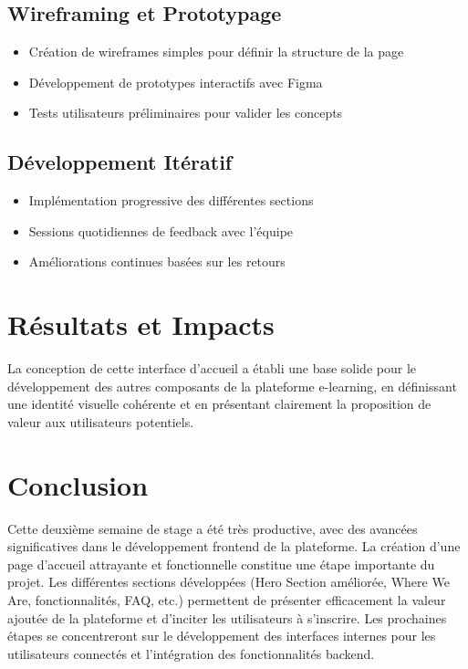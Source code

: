 \subsection{Wireframing et Prototypage}
\begin{itemize}
  \item Création de wireframes simples pour définir la structure de la page
  \item Développement de prototypes interactifs avec Figma
  \item Tests utilisateurs préliminaires pour valider les concepts
\end{itemize}

\subsection{Développement Itératif}
\begin{itemize}
  \item Implémentation progressive des différentes sections
  \item Sessions quotidiennes de feedback avec l'équipe
  \item Améliorations continues basées sur les retours
\end{itemize}

\section{Résultats et Impacts}

La conception de cette interface d'accueil a établi une base solide pour le développement des autres composants de la plateforme e-learning, en définissant une identité visuelle cohérente et en présentant clairement la proposition de valeur aux utilisateurs potentiels. 

\section{Conclusion}

Cette deuxième semaine de stage a été très productive, avec des avancées significatives dans le développement frontend de la plateforme. La création d'une page d'accueil attrayante et fonctionnelle constitue une étape importante du projet. Les différentes sections développées (Hero Section améliorée, Where We Are, fonctionnalités, FAQ, etc.) permettent de présenter efficacement la valeur ajoutée de la plateforme et d'inciter les utilisateurs à s'inscrire. Les prochaines étapes se concentreront sur le développement des interfaces internes pour les utilisateurs connectés et l'intégration des fonctionnalités backend. 